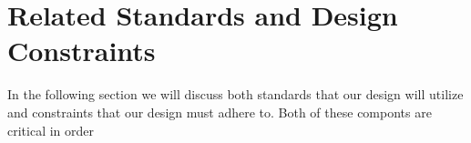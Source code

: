 \section{Related Standards and Design Constraints}
In the following section we will discuss both standards that our design will utilize and constraints that our design must adhere to. Both of these componts are critical in order 


